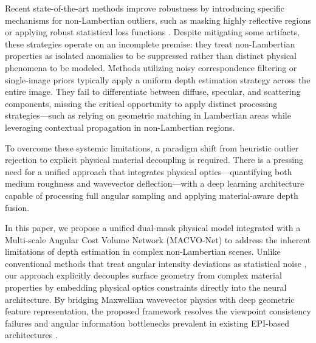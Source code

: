 \documentclass[lettersize,journal]{IEEEtran}
\begin{document}
Recent state-of-the-art methods improve robustness by introducing specific mechanisms for non-Lambertian outliers, such as masking highly reflective regions or applying robust statistical loss functions \cite{li2021, zhang2023}. Despite mitigating some artifacts, these strategies operate on an incomplete premise: they treat non-Lambertian properties as isolated anomalies to be suppressed rather than distinct physical phenomena to be modeled. Methods utilizing noisy correspondence filtering \cite{wang2023} or single-image priors \cite{peng2022} typically apply a uniform depth estimation strategy across the entire image. They fail to differentiate between diffuse, specular, and scattering components, missing the critical opportunity to apply distinct processing strategies—such as relying on geometric matching in Lambertian areas while leveraging contextual propagation in non-Lambertian regions.

To overcome these systemic limitations, a paradigm shift from heuristic outlier rejection to explicit physical material decoupling is required. There is a pressing need for a unified approach that integrates physical optics—quantifying both medium roughness and wavevector deflection—with a deep learning architecture capable of processing full angular sampling and applying material-aware depth fusion.

In this paper, we propose a unified dual-mask physical model integrated with a Multi-scale Angular Cost Volume Network (MACVO-Net) to address the inherent limitations of depth estimation in complex non-Lambertian scenes. Unlike conventional methods that treat angular intensity deviations as statistical noise \cite{wanner2014, tao2013}, our approach explicitly decouples surface geometry from complex material properties by embedding physical optics constraints directly into the neural architecture. By bridging Maxwellian wavevector physics with deep geometric feature representation, the proposed framework resolves the viewpoint consistency failures and angular information bottlenecks prevalent in existing EPI-based architectures \cite{heber2018}.
\end{document}
